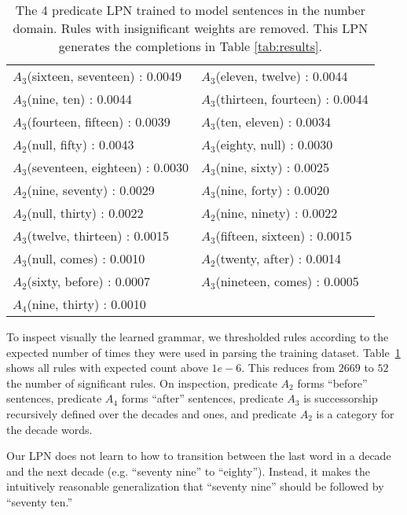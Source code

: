 \documentclass[10pt, twocolumn]{article}
\begin{document}
\begin{table}[h]
\begin{tabular}{>{\tiny} l >{\tiny} l}
$A_3$(sixteen, seventeen) : 0.0049 &
$A_3$(eleven, twelve) : 0.0044 \\
$A_3$(nine, ten) : 0.0044 &
$A_3$(thirteen, fourteen) : 0.0044 \\
$A_3$(fourteen, fifteen) : 0.0039 &
$A_3$(ten, eleven) : 0.0034 \\
$A_2$(null, fifty) : 0.0043 &
$A_3$(eighty, null) : 0.0030 \\
$A_3$(seventeen, eighteen) : 0.0030 &
$A_3$(nine, sixty) : 0.0025 \\
$A_2$(nine, seventy) : 0.0029 &
$A_3$(nine, forty) : 0.0020 \\
$A_2$(null, thirty) : 0.0022 &
$A_2$(nine, ninety) : 0.0022 \\
$A_3$(twelve, thirteen) : 0.0015 &
$A_3$(fifteen, sixteen) : 0.0015 \\
$A_3$(null, comes) : 0.0010 &
$A_2$(twenty, after) : 0.0014 \\
$A_2$(sixty, before) : 0.0007 &
$A_3$(nineteen, comes) : 0.0005 \\
$A_4$(nine, thirty) : 0.0010 & \\
\end{tabular}
\caption{The 4 predicate LPN trained to model sentences in the number domain. Rules with insignificant weights are removed. This LPN generates the completions in Table \ref{tab:results}.}
\label{tab:grammar}
\end{table}

To inspect visually the learned grammar, we thresholded rules
according to the expected number of times they were used in parsing
the training dataset. Table~\ref{tab:grammar} shows all rules with
expected count above $1e-6$. This reduces from $2669$ to $52$ the
number of significant rules. On inspection, predicate $A_2$ forms
``before'' sentences, predicate $A_4$ forms ``after'' sentences,
predicate $A_3$ is successorship recursively defined over the decades
and ones, and predicate $A_2$ is a category for the decade words.

Our LPN does not learn to how to transition between the last word in a decade
and the next decade (e.g. ``seventy nine'' to ``eighty''). Instead, it
makes the intuitively reasonable generalization that ``seventy nine''
should be followed by ``seventy ten.'' 
\end{document}
